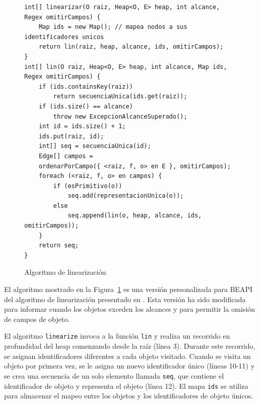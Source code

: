 \bigbreak

\begin{figure}[!th]
\begin{lstlisting}
int[] linearizar(O raiz, Heap<O, E> heap, int alcance, Regex omitirCampos) {
    Map ids = new Map(); // mapea nodos a sus identificadores unicos
    return lin(raiz, heap, alcance, ids, omitirCampos);
}
int[] lin(O raiz, Heap<O, E> heap, int alcance, Map ids, Regex omitirCampos) {
    if (ids.containsKey(raiz))
        return secuenciaUnica(ids.get(raiz));
    if (ids.size() == alcance)
        throw new ExcepcionAlcanceSuperado();
    int id = ids.size() + 1;
    ids.put(raiz, id);
    int[] seq = secuenciaUnica(id);
    Edge[] campos =
    ordenarPorCampo({ <raiz, f, o> en E }, omitirCampos);
    foreach (<raiz, f, o> en campos) {
        if (esPrimitivo(o))
            seq.add(representacionUnica(o));
        else
            seq.append(lin(o, heap, alcance, ids, omitirCampos));
    }
    return seq;
}
\end{lstlisting}
\caption{Algoritmo de linearización}
\label{alg:linearization}
\end{figure}





El algoritmo mostrado en la Figura~\ref{alg:linearization} es una versión personalizada para \textsf{BEAPI} del algoritmo de linearización presentado en \cite{Xie04}. Esta versión ha sido modificada para informar cuando los objetos exceden los alcances y para permitir la omisión de campos de objeto.

El algoritmo \texttt{linearize} invoca a la función \texttt{lin} y realiza un recorrido en profundidad del heap comenzando desde la raíz (línea 3). Durante este recorrido, se asignan identificadores diferentes a cada objeto visitado. Cuando se visita un objeto por primera vez, se le asigna un nuevo identificador único (líneas 10-11) y se crea una secuencia de un solo elemento llamada \texttt{seq}, que contiene el identificador de objeto y representa el objeto (línea 12). El mapa \texttt{ids} se utiliza para almacenar el mapeo entre los objetos y los identificadores de objeto únicos.

